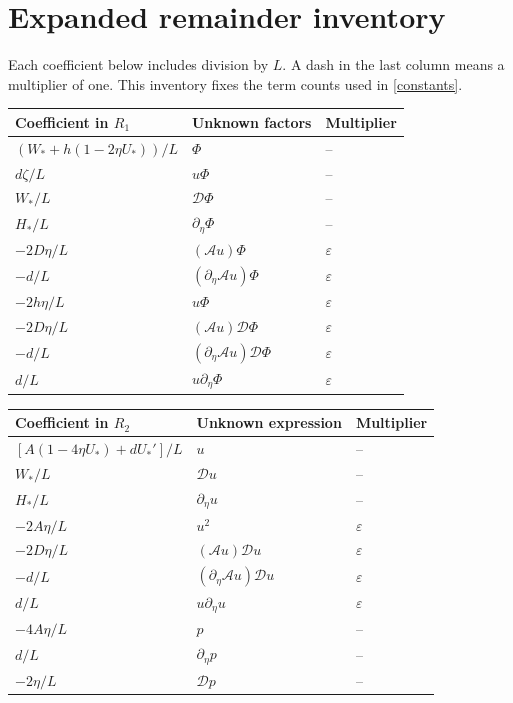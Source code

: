 \documentclass[11pt]{article}
\newcommand{\Av}{\mathcal A}
\newcommand{\DY}{\mathcal D}
\begin{document}
\appendix
\section{Expanded remainder inventory}\label{terms}
Each coefficient below includes division by $L$. A dash in the last
column means a multiplier of one. This inventory fixes the term counts
used in \eqref{constants}.
\begin{center}\small
\begin{tabular}{lll}
\toprule Coefficient in $R_1$ & Unknown factors & Multiplier\\\midrule
$(W_*+h(1-2\eta U_*))/L$ & $\Phi$ & --\\
$d\zeta/L$ & $u\Phi$ & --\\
$W_*/L$ & $\DY\Phi$ & --\\
$H_*/L$ & $\partial_\eta\Phi$ & --\\
$-2D\eta/L$ & $(\Av u)\Phi$ & $\varepsilon$\\
$-d/L$ & $(\partial_\eta\Av u)\Phi$ & $\varepsilon$\\
$-2h\eta/L$ & $u\Phi$ & $\varepsilon$\\
$-2D\eta/L$ & $(\Av u)\DY\Phi$ & $\varepsilon$\\
$-d/L$ & $(\partial_\eta\Av u)\DY\Phi$ & $\varepsilon$\\
$d/L$ & $u\partial_\eta\Phi$ & $\varepsilon$\\\bottomrule
\end{tabular}
\end{center}
\begin{center}\small
\begin{tabular}{lll}
\toprule Coefficient in $R_2$ & Unknown expression & Multiplier\\\midrule
$[A(1-4\eta U_*)+dU_*']/L$ & $u$ & --\\
$W_*/L$ & $\DY u$ & --\\
$H_*/L$ & $\partial_\eta u$ & --\\
$-2A\eta/L$ & $u^2$ & $\varepsilon$\\
$-2D\eta/L$ & $(\Av u)\DY u$ & $\varepsilon$\\
$-d/L$ & $(\partial_\eta\Av u)\DY u$ & $\varepsilon$\\
$d/L$ & $u\partial_\eta u$ & $\varepsilon$\\
$-4A\eta/L$ & $p$ & --\\
$d/L$ & $\partial_\eta p$ & --\\
$-2\eta/L$ & $\DY p$ & --\\\bottomrule
\end{tabular}
\end{center}
\end{document}

